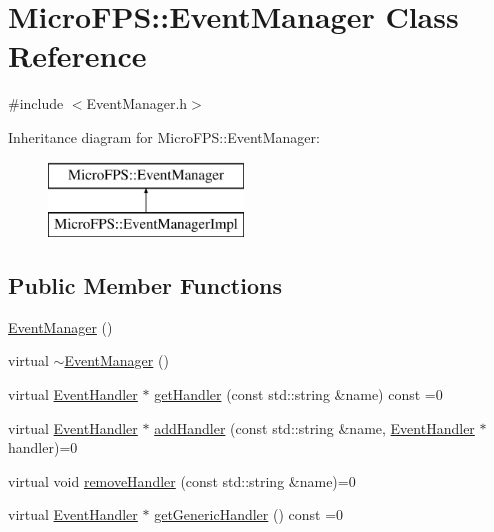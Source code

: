 \hypertarget{class_micro_f_p_s_1_1_event_manager}{
\section{MicroFPS::EventManager Class Reference}
\label{d8/d5a/class_micro_f_p_s_1_1_event_manager}
}


{\ttfamily \#include $<$EventManager.h$>$}

Inheritance diagram for MicroFPS::EventManager:\begin{figure}[H]
\begin{center}
\leavevmode
\includegraphics[height=2.000000cm]{d8/d5a/class_micro_f_p_s_1_1_event_manager}
\end{center}
\end{figure}
\subsection*{Public Member Functions}
\begin{DoxyCompactItemize}
\item 
\hyperlink{class_micro_f_p_s_1_1_event_manager_a02ee5e87931bb22698001afbe0d918a5}{EventManager} ()
\item 
virtual \hyperlink{class_micro_f_p_s_1_1_event_manager_ac361f75603b9b9df15ad67411750bca3}{$\sim$EventManager} ()
\item 
virtual \hyperlink{class_micro_f_p_s_1_1_event_handler}{EventHandler} $\ast$ \hyperlink{class_micro_f_p_s_1_1_event_manager_ad690afd2f2f8f178f9bba29a85613949}{getHandler} (const std::string \&name) const =0
\item 
virtual \hyperlink{class_micro_f_p_s_1_1_event_handler}{EventHandler} $\ast$ \hyperlink{class_micro_f_p_s_1_1_event_manager_aa27487e18d3cc6480a9efad513d79996}{addHandler} (const std::string \&name, \hyperlink{class_micro_f_p_s_1_1_event_handler}{EventHandler} $\ast$handler)=0
\item 
virtual void \hyperlink{class_micro_f_p_s_1_1_event_manager_ac575b16e0c608ffb5fcde9e861b4c876}{removeHandler} (const std::string \&name)=0
\item 
virtual \hyperlink{class_micro_f_p_s_1_1_event_handler}{EventHandler} $\ast$ \hyperlink{class_micro_f_p_s_1_1_event_manager_ac9bc6edff543d37c14181b7cb30d653e}{getGenericHandler} () const =0
\end{DoxyCompactItemize}


